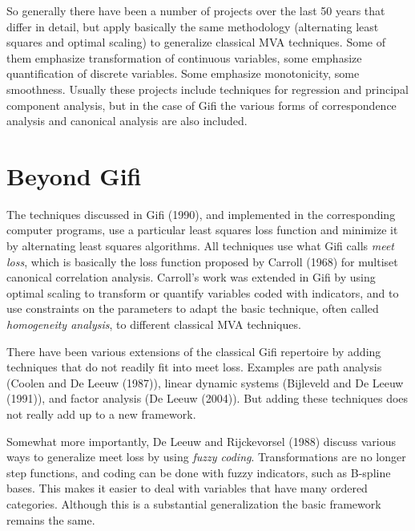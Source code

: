 \documentclass[
  12pt,
  letterpaper,
  DIV=11,
  numbers=noendperiod]{scrreprt}
\begin{document}
So generally there have been a number of projects over the last 50 years
that differ in detail, but apply basically the same methodology
(alternating least squares and optimal scaling) to generalize classical
MVA techniques. Some of them emphasize transformation of continuous
variables, some emphasize quantification of discrete variables. Some
emphasize monotonicity, some smoothness. Usually these projects include
techniques for regression and principal component analysis, but in the
case of Gifi the various forms of correspondence analysis and canonical
analysis are also included.

\section{Beyond Gifi}\label{beyond-gifi}

The techniques discussed in Gifi (1990), and implemented in the
corresponding computer programs, use a particular least squares loss
function and minimize it by alternating least squares algorithms. All
techniques use what Gifi calls \emph{meet loss}, which is basically the
loss function proposed by Carroll (1968) for multiset canonical
correlation analysis. Carroll's work was extended in Gifi by using
optimal scaling to transform or quantify variables coded with
indicators, and to use constraints on the parameters to adapt the basic
technique, often called \emph{homogeneity analysis}, to different
classical MVA techniques.

There have been various extensions of the classical Gifi repertoire by
adding techniques that do not readily fit into meet loss. Examples are
path analysis (Coolen and De Leeuw (1987)), linear dynamic systems
(Bijleveld and De Leeuw (1991)), and factor analysis (De Leeuw (2004)).
But adding these techniques does not really add up to a new framework.

Somewhat more importantly, De Leeuw and Rijckevorsel (1988) discuss
various ways to generalize meet loss by using \emph{fuzzy coding}.
Transformations are no longer step functions, and coding can be done
with fuzzy indicators, such as B-spline bases. This makes it easier to
deal with variables that have many ordered categories. Although this is
a substantial generalization the basic framework remains the same.
\end{document}
